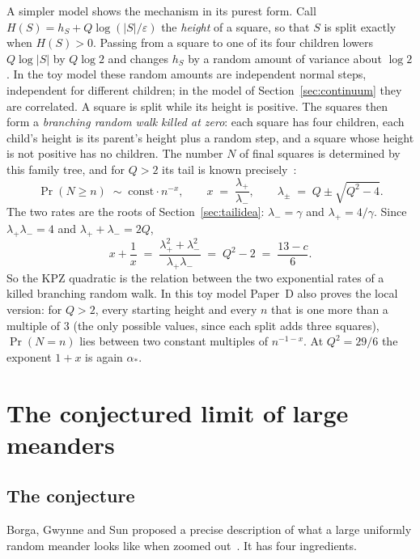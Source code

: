 A simpler model shows the mechanism in its purest form. Call
$H(S)=h_S+Q\log(|S|/\varepsilon)$ the \emph{height} of a square, so that $S$ is split exactly when
$H(S)>0$. Passing from a square to one of its four children lowers $Q\log|S|$ by $Q\log2$ and
changes $h_S$ by a random amount of variance about $\log2$. In the toy model these random amounts
are independent normal steps, independent for different children; in the model of
Section~\ref{sec:continuum} they are correlated. A square is split while its height is positive.
The squares then form a \emph{branching random walk killed at zero}: each square has four
children, each child's height is its parent's height plus a random step, and a square whose height
is not positive has no children. The number $N$ of final squares is determined by this family
tree, and for $Q>2$ its tail is known precisely~\cite{AHZ}:
\[ \Pr(N\ge n) \;\sim\; \mathrm{const}\cdot n^{-x}, \qquad x \;=\; \frac{\lambda_+}{\lambda_-},
\qquad \lambda_\pm \;=\; Q\pm\sqrt{Q^2-4}. \]
The two rates are the roots of Section~\ref{sec:tailidea}: $\lambda_-=\gamma$ and
$\lambda_+=4/\gamma$. Since $\lambda_+\lambda_-=4$ and $\lambda_++\lambda_-=2Q$,
\[ x+\frac1x \;=\; \frac{\lambda_+^2+\lambda_-^2}{\lambda_+\lambda_-} \;=\; Q^2-2 \;=\; \frac{13-c}{6} .\]
So the KPZ quadratic is the relation between the two exponential rates of a killed branching
random walk. In this toy model Paper~D also proves the local version: for $Q>2$, every
starting height and every $n$ that is one more than a multiple of $3$ (the only possible values,
since each split adds three squares), $\Pr(N=n)$ lies between two constant multiples of
$n^{-1-x}$. At $Q^2=29/6$ the
exponent $1+x$ is again $\alpha_*$.

\section{The conjectured limit of large meanders}\label{sec:limit}

\subsection{The conjecture}

Borga, Gwynne and Sun proposed a precise description of what a large uniformly random meander
looks like when zoomed out~\cite{BGS}. It has four ingredients.

